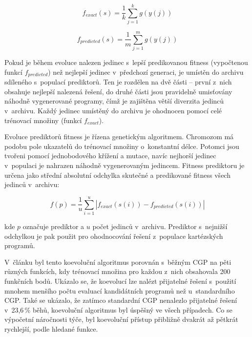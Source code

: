 \begin{equation}
    \label{eqFexact}
    f_{\mathit{exact}} \left( s \right) = \frac{1}{k} \sum\limits_{j=1}^{k} g \left( y \left( j \right) \right)
\end{equation}

\begin{equation}
    \label{eqFpredicted}
    f_{\mathit{predicted}} \left( s \right) = \frac{1}{m} \sum\limits_{j=1}^{m} g \left( y \left( j \right) \right)
\end{equation}

Pokud je během evoluce nalezen jedinec s~lepší predikovanou fitness (vypočtenou funkcí $f_{\mathit{predicted}}$) než nejlepší jedinec v~předchozí generaci, je umístěn do archivu sdíleného s~populací prediktorů. Ten je rozdělen na dvě části -- první z~nich obsahuje nejlepší nalezená řešení, do druhé části jsou pravidelně umisťovány náhodně vygenerované programy, čímž je zajištěna větší diverzita jedinců v~archivu. Každý jedinec umístěný do archivu je ohodnocen pomocí celé trénovací množiny (funkcí $f_{\mathit{exact}}$).

Evoluce prediktorů fitness je řízena genetickým algoritmem. Chromozom má podobu pole ukazatelů do trénovací množiny o~konstantní délce. Potomci jsou tvořeni pomocí jednobodového křížení a mutace, navíc nejhorší jedinec v~populaci je nahrazen náhodně vygenerovaným jedincem. Fitness prediktoru je určena jako střední absolutní odchylka skutečné a predikované fitness všech jedinců v~archivu:

\begin{equation}
    \label{eqFpredictorSR}
    f \left( p \right) = \frac{1}{u} \sum\limits_{i=1}^{u} \left| f_{\mathit{exact}} \left( s \left( i \right) \right) - f_{\mathit{predicted}} \left( s \left( i \right) \right) \right|
\end{equation}



\noindent{}kde $p$ označuje prediktor a $u$ počet jedinců v~archivu. Prediktor s~nejnižší odchylkou je pak použit pro ohodnocování řešení z~populace kartézských programů.

V~článku \cite{SikuEuroGP} byl tento koevoluční algoritmus porovnán s~běžným CGP na pěti různých funkcích, kdy trénovací množina pro každou z~nich obsahovala 200 funkčních bodů. Ukázalo se, že koevolucí lze nalézt přijatelné řešení s~použití mnohem menšího počtu evaluací kandidátních programů než u~standardního CGP. Také se ukázalo, že zatímco standardní CGP nenalezlo přijatelné řešení v~23,6\,\% běhů, koevoluční algoritmus byl úspěšný ve všech případech. Co se výpočetní náročnosti týče, byl koevoluční přístup přibližně dvakrát až pětkrát rychlejší, podle hledané funkce.


